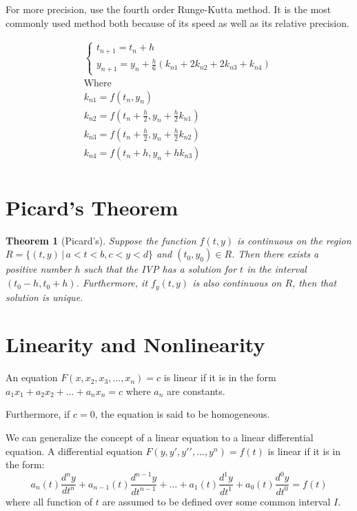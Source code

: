 \documentclass[12pt, landscape, twocolumn]{article}
\newtheorem{thm}{Theorem}
\begin{document}
    For more precision, use the fourth order Runge-Kutta method. It is the most commonly used method both because of its speed as well as its relative precision.

    \begin{equation}\label{eq:4ork}
    \begin{aligned}
    \begin{cases}
    t_{n+1} = t_n + h\\
    y_{n+1} = y_n + \frac{h}{6} \left( k_{n1} + 2 k_{n2} + 2 k_{n3} + k_{n4} \right)
    \end{cases}\\
    \text{Where}\\
    k_{n1} = f(t_n, y_n)\\
    k_{n2} = f \left( t_n + \frac{h}{2}, y_n + \frac{h}{2} k_{n1} \right)\\
    k_{n3} = f \left( t_n + \frac{h}{2}, y_n + \frac{h}{2} k_{n2} \right)\\
    k_{n4} = f \left( t_n + h, y_n + h k_{n3} \right)\\
    \end{aligned}
    \end{equation}

\section{Picard's Theorem}\label{sec:picardstheorem}

    \begin{thm}[Picard's]
        Suppose the function $f(t, y)$ is continuous on the region $R=\{ (t,y) \, | \, a < t < b, c < y < d \}$ and $(t_0, y_0) \in R$. Then there exists a positive number $h$ such that the IVP has a solution for $t$ in the interval $(t_0 - h, t_0 + h)$. Furthermore, it $f_y(t,y)$ is also continuous on $R$, then that solution is unique.
    \end{thm}

\section{Linearity and Nonlinearity}
An equation $F(x, x_2, x_3, \dots, x_n) = c$ is linear if it is in the form $a_1x_1 + a_2x_2 + \dots + a_nx_n = c$ where $a_n$ are constants.

Furthermore, if $c=0$, the equation is said to be homogeneous.

We can generalize the concept of a linear equation to a linear differential equation. A differential equation $F(y, y\prime, y\prime\prime, \dots, y^n) = f(t)$ is linear if it is in the form:
\[
a_n(t) \frac{d^ny}{dt^n} + a_{n-1}(t) \frac{d^{n-1}y}{dt^{n-1} } + \dots + a_1(t) \frac{d^1y}{dt^1} + a_0(t) \frac{d^0y}{dt^0} = f(t)
\]
where all function of $t$ are assumed to be defined over some common interval $I$.
\end{document}

